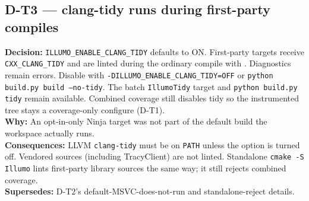 \subsection*{D-T3 --- clang-tidy runs during first-party compiles}
\begin{decisionbox}[title={D-T3 \quad 2026-08-30}]
\textbf{Decision:} \texttt{ILLUMO\_ENABLE\_CLANG\_TIDY} defaults to ON.
First-party targets receive \texttt{CXX\_CLANG\_TIDY} and are linted during
the ordinary compile with . Diagnostics remain errors.
Disable with \texttt{-DILLUMO\_ENABLE\_CLANG\_TIDY=OFF} or
\texttt{python build.py build --no-tidy}. The batch \texttt{IllumoTidy} target
and \texttt{python build.py tidy} remain available. Combined coverage still
disables tidy so the instrumented tree stays a coverage-only configure
(D-T1).\\
\textbf{Why:} An opt-in-only Ninja target was not part of the default build
the workspace actually runs.\\
\textbf{Consequences:} LLVM \texttt{clang-tidy} must be on \texttt{PATH} unless
the option is turned off. Vendored sources (including TracyClient) are not
linted. Standalone \texttt{cmake -S Illumo} lints first-party library sources
the same way; it still rejects combined coverage.\\
\textbf{Supersedes:} D-T2's default-MSVC-does-not-run and standalone-reject
details.
\end{decisionbox}

